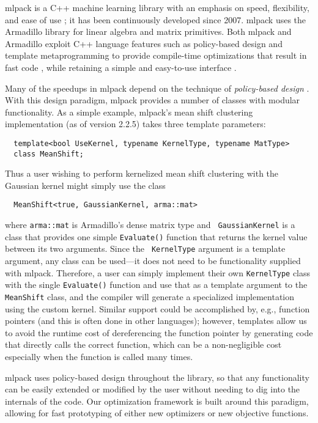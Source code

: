 \documentclass{article}
\begin{document}
mlpack is a C++ machine learning library with an emphasis on speed, flexibility,
and ease of use \cite{mlpack2013}; it has been continuously developed since
2007.  mlpack uses the Armadillo library \cite{pasc2017} for
linear algebra and matrix primitives.  Both mlpack and Armadillo exploit C++
language features such as policy-based design and template metaprogramming to
provide compile-time optimizations that result in fast code \cite{pasc2017},
while retaining a simple and easy-to-use interface \cite{icopust2017}.

Many of the speedups in mlpack depend on the technique of {\it policy-based
design} \cite{Alexandrescu2001}.  With this design paradigm, mlpack
provides a number of classes with modular functionality.  As a simple example,
mlpack's mean shift clustering implementation (as of version 2.2.5) takes three
template parameters:

\begin{verbatim}
  template<bool UseKernel, typename KernelType, typename MatType>
  class MeanShift;
\end{verbatim}

Thus a user wishing to perform kernelized mean shift clustering with the
Gaussian kernel might simply use the class

\begin{verbatim}
  MeanShift<true, GaussianKernel, arma::mat>
\end{verbatim}

\noindent where {\tt arma::mat} is Armadillo's dense matrix type and {\tt
GaussianKernel} is a class that provides one simple {\tt Evaluate()} function
that returns the kernel value between its two arguments.  Since the {\tt
KernelType} argument is a template argument, any class can be used---it does not
need to be functionality supplied with mlpack.  Therefore, a user can simply
implement their own {\tt KernelType} class with the single {\tt Evaluate()}
function and use that as a template argument to the {\tt MeanShift} class, and
the compiler will generate a specialized implementation using the custom kernel.
Similar support could be accomplished by, e.g., function pointers (and this is
often done in other languages); however, templates allow us to avoid the runtime
cost of dereferencing the function pointer by generating code that directly
calls the correct function, which can be a non-negligible cost especially when
the function is called many times.

mlpack uses policy-based design throughout the library, so that any
functionality can be easily extended or modified by the user without needing to
dig into the internals of the code.  Our optimization framework is built around
this paradigm, allowing for fast prototyping of either new optimizers or new
objective functions.
\end{document}

